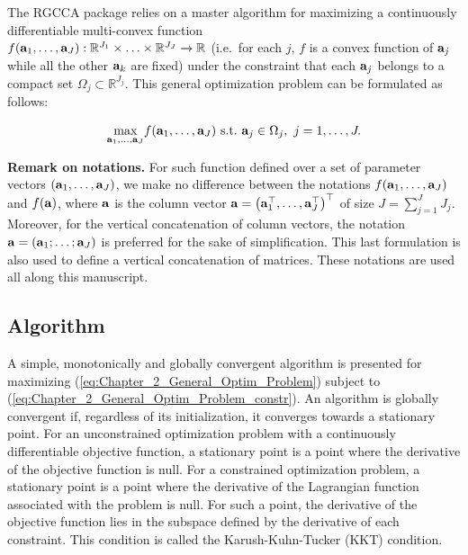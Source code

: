 \documentclass[
]{jss}
\begin{document}
The RGCCA package relies on a master algorithm for maximizing a
continuously differentiable multi-convex function\\
\(f(\mathbf{a}_1, \ldots,\mathbf{a}_J):\mathbb{R}^{J_1}\times \ldots \times \mathbb{R}^{J_J} \xrightarrow{}\mathbb{R}\)
(i.e.~for each \(j\), \(f\) is a convex function of \(\mathbf{a}_j\) while
all the other \(\mathbf{a}_k\) are fixed) under the constraint that each
\(\mathbf{a}_j\) belongs to a compact set
\(\Omega_j\subset \mathbb{R}^{J_j}\). This general optimization problem
can be formulated as follows:

\begin{align}
\underset{\mathbf{a}_1, \ldots,\mathbf{a}_J}{\text{max}} f(\mathbf{a}_1, \ldots,\mathbf{a}_J)
\text{~s.t.~} \mathbf{a}_j \in \Omega_j, ~ j = 1, \ldots, J.
\label{eq:Chapter_2_General_Optim_Problem_constr}
\end{align}

\textbf{Remark on notations.} For such function defined over a set of
parameter vectors \((\mathbf{a}_1, \ldots,\mathbf{a}_J)\), we make no difference
between the notations \(f(\mathbf{a}_1, \ldots,\mathbf{a}_J)\) and \(f(\mathbf{a})\),
where \(\mathbf{a}\) is the column vector
\(\mathbf{a} = \left( \mathbf{a}_1^\top, \ldots, \mathbf{a}_J^\top\right)^\top\) of
size \(J = \sum_{j=1}^{J}J_j\). Moreover, for the vertical concatenation
of column vectors, the notation
\(\mathbf{a} = \left( \mathbf{a}_1; \ldots; \mathbf{a}_J \right)\) is preferred for the
sake of simplification. This last formulation is also used to define a
vertical concatenation of matrices. These notations are used all along
this manuscript.

\hypertarget{algorithm-1}{%
\subsection{Algorithm}\label{algorithm-1}}

A simple, monotonically and globally convergent algorithm is presented
for maximizing (\ref{eq:Chapter_2_General_Optim_Problem}) subject to
(\ref{eq:Chapter_2_General_Optim_Problem_constr}). An algorithm is
globally convergent if, regardless of its initialization, it converges
towards a stationary point. For an unconstrained optimization problem
with a continuously differentiable objective function, a stationary
point is a point where the derivative of the objective function is null.
For a constrained optimization problem, a stationary point is a point
where the derivative of the Lagrangian function associated with the
problem is null. For such a point, the derivative of the objective
function lies in the subspace defined by the derivative of each
constraint. This condition is called the Karush-Kuhn-Tucker (KKT)
condition.
\end{document}
